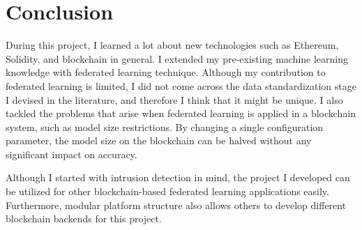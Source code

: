 
\section{Conclusion}

During this project, I learned a lot about new technologies such as Ethereum, Solidity, and blockchain in general.
I extended my pre-existing machine learning knowledge with federated learning technique.
Although my contribution to federated learning is limited, I did not come across the data standardization stage I devised in the literature, and therefore I think that it might be unique.
I also tackled the problems that arise when federated learning is applied in a blockchain system, such as model size restrictions.
By changing a single configuration parameter, the model size on the blockchain can be halved without any significant impact on accuracy.

Although I started with intrusion detection in mind, the project I developed can be utilized for other blockchain-based federated learning applications easily.
Furthermore, modular platform structure also allows others to develop different blockchain backends for this project.
